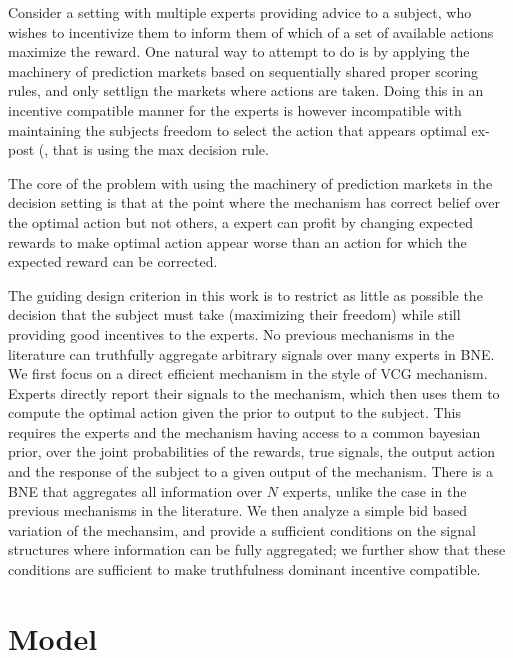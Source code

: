 
Consider a setting with multiple experts providing advice to a subject, who wishes to incentivize them to inform them of which of a set of available actions maximize the reward.
One natural way to attempt to do is by applying the machinery of prediction markets based on sequentially shared proper scoring rules, and only settlign the markets where actions are taken. Doing this in an incentive compatible manner for the experts is however incompatible with maintaining the subjects freedom to select the action that appears optimal ex-post (\cite{othman2010decision,  chen2014eliciting}, that is using the max decision rule. 

The core of the problem with using the machinery of prediction markets in the decision setting is that at the point where the mechanism has correct belief over the optimal action but not others, a expert  can profit by changing expected rewards to make optimal action appear worse than an action for which the expected reward can be corrected.


The guiding design criterion in this work is to restrict as little as possible the decision that the subject must take (maximizing their freedom) while still providing good incentives to the experts. No previous mechanisms in the literature can truthfully aggregate arbitrary signals over many experts in BNE. 
We first focus on a direct efficient mechanism in the style of VCG mechanism. Experts directly report their signals to the mechanism, which then uses them to compute the optimal action given the prior to output to the subject. This requires  the experts and the mechanism having access to a common bayesian prior, over the joint probabilities of the rewards, true signals, the output action and the response of the subject to a given output of the mechanism. There is a BNE that aggregates all information over $N$ experts, unlike the case in the previous mechanisms in the literature.
We then analyze a simple bid based variation of the mechansim, and provide a sufficient conditions on the signal structures where information can be fully aggregated; we further show that these conditions are sufficient to make truthfulness dominant incentive compatible.  


\section{Model}


